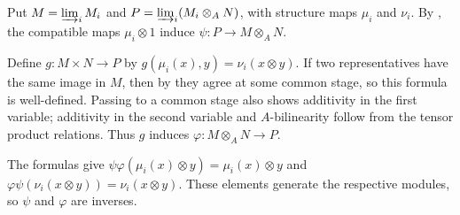 Put $M=\varinjlim_iM_i$ and $P=\varinjlim_i(M_i\otimes_A N)$, with structure maps $\mu_i$ and $\nu_i$. By , the compatible maps $\mu_i\otimes1$ induce $\psi:P\to M\otimes_A N$.

Define $g:M\times N\to P$ by $g(\mu_i(x),y)=\nu_i(x\otimes y)$. If two representatives have the same image in $M$, then by  they agree at some common stage, so this formula is well-defined. Passing to a common stage also shows additivity in the first variable; additivity in the second variable and $A$-bilinearity follow from the tensor product relations. Thus $g$ induces $\varphi:M\otimes_A N\to P$.

The formulas give $\psi\varphi(\mu_i(x)\otimes y)=\mu_i(x)\otimes y$ and $\varphi\psi(\nu_i(x\otimes y))=\nu_i(x\otimes y)$. These elements generate the respective modules, so $\psi$ and $\varphi$ are inverses.
